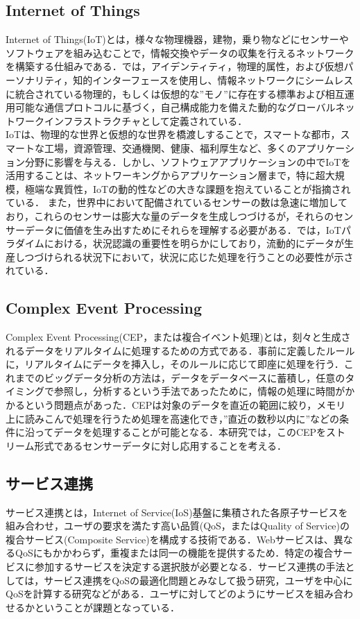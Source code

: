 \documentclass{kuisthesis}			%
\begin{document}
\subsection{Internet of Things}\label{subsec-abstract}
Internet of Things(IoT)とは，様々な物理機器，建物，乗り物などにセンサーやソフトウェアを組み込むことで，情報交換やデータの収集を行えるネットワークを構築する仕組みである．\cite{Vermesan2009}では，アイデンティティ，物理的属性，および仮想パーソナリティ，知的インターフェースを使用し、情報ネットワークにシームレスに統合されている物理的，もしくは仮想的な”モノ”に存在する標準および相互運用可能な通信プロトコルに基づく，自己構成能力を備えた動的なグローバルネットワークインフラストラクチャとして定義されている．\\
IoTは、物理的な世界と仮想的な世界を橋渡しすることで，スマートな都市，スマートな工場，資源管理、交通機関、健康、福利厚生など、多くのアプリケーション分野に影響を与える．しかし、ソフトウェアアプリケーションの中でIoTを活用することは、ネットワーキングからアプリケーション層まで，特に超大規模，極端な異質性，IoTの動的性などの大きな課題を抱えていることが指摘されている．\cite{Bouloukakis2016}
また，世界中において配備されているセンサーの数は急速に増加しており，これらのセンサーは膨大な量のデータを生成しつづけるが，それらのセンサーデータに価値を生み出すためにそれらを理解する必要がある．\cite{Perera2014}では，IoTパラダイムにおける，状況認識の重要性を明らかにしており，流動的にデータが生産しつづけられる状況下において，状況に応じた処理を行うことの必要性が示されている．

\subsection{Complex Event Processing}
Complex Event Processing(CEP，または複合イベント処理)とは，刻々と生成されるデータをリアルタイムに処理するための方式である．事前に定義したルールに，リアルタイムにデータを挿入し，そのルールに応じて即座に処理を行う．これまでのビッグデータ分析の方法は，データをデータベースに蓄積し，任意のタイミングで参照し，分析するという手法であったために，情報の処理に時間がかかるという問題点があった．CEPは対象のデータを直近の範囲に絞り，メモリ上に読みこんで処理を行うため処理を高速化でき，”直近の数秒以内に”などの条件に沿ってデータを処理することが可能となる．本研究では，このCEPをストリーム形式であるセンサーデータに対し応用することを考える．

\subsection{サービス連携}
サービス連携とは，Internet of Service(IoS)基盤に集積された各原子サービスを組み合わせ，ユーザの要求を満たす高い品質(QoS，またはQuality of Service)の複合サービス(Composite Service)を構成する技術である．Webサービスは、異なるQoSにもかかわらず，重複または同一の機能を提供するため．特定の複合サービスに参加するサービスを決定する選択肢が必要となる．\cite{Zeng2004}サービス連携の手法としては，サービス連携をQoSの最適化問題とみなして扱う研究\cite{Alrifai2009}\cite{Alrifai2010}，ユーザを中心にQoSを計算する研究\cite{Lin2012}\cite{Shi2012}などがある．ユーザに対してどのようにサービスを組み合わせるかということが課題となっている．
\end{document}
